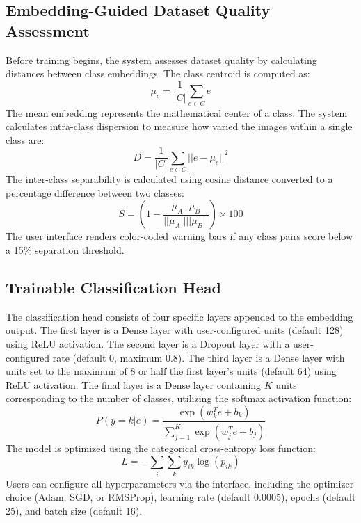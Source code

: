\documentclass[conference]{IEEEtran}
\begin{document}
\subsection{Embedding-Guided Dataset Quality Assessment}
Before training begins, the system assesses dataset quality by calculating distances between class embeddings. The class centroid is computed as:
\begin{equation}
\mu_c = \frac{1}{|C|} \sum_{e \in C} e
\end{equation}
The mean embedding represents the mathematical center of a class. The system calculates intra-class dispersion to measure how varied the images within a single class are:
\begin{equation}
D = \frac{1}{|C|} \sum_{e \in C} ||e - \mu_c||^2
\end{equation}
The inter-class separability is calculated using cosine distance converted to a percentage difference between two classes:
\begin{equation}
S = \left(1 - \frac{\mu_A \cdot \mu_B}{||\mu_A|| ||\mu_B||}\right) \times 100
\end{equation}
The user interface renders color-coded warning bars if any class pairs score below a 15\% separation threshold.

\subsection{Trainable Classification Head}
The classification head consists of four specific layers appended to the embedding output. The first layer is a Dense layer with user-configured units (default 128) using ReLU activation. The second layer is a Dropout layer with a user-configured rate (default 0, maximum 0.8). The third layer is a Dense layer with units set to the maximum of 8 or half the first layer's units (default 64) using ReLU activation. The final layer is a Dense layer containing $K$ units corresponding to the number of classes, utilizing the softmax activation function:
\begin{equation}
P(y=k|e) = \frac{\exp(w_k^T e + b_k)}{\sum_{j=1}^K \exp(w_j^T e + b_j)}
\end{equation}
The model is optimized using the categorical cross-entropy loss function:
\begin{equation}
L = -\sum_{i} \sum_{k} y_{ik} \log(p_{ik})
\end{equation}
Users can configure all hyperparameters via the interface, including the optimizer choice (Adam, SGD, or RMSProp), learning rate (default 0.0005), epochs (default 25), and batch size (default 16).
\end{document}
